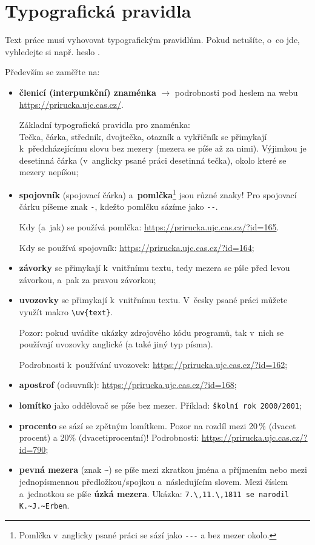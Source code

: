 \section{Typografická pravidla}\label{podkapTypo}
Text práce musí vyhovovat typografickým pravidlům. Pokud netušíte, o~co jde, vyhledejte si např. heslo .
\par 
Především se zaměřte na:
\begin{itemize}\itemsep=2pt
\item {\bf členicí (interpunkční) znaménka} $\rightarrow$ podrobnosti pod heslem  na webu \url{https://prirucka.ujc.cas.cz/}.\par
Základní typografická pravidla pro znaménka:\\
Tečka, čárka, středník, dvojtečka, otazník a vykřičník se přimykají k~předcházejícímu slovu bez mezery (mezera se píše až za nimi). Výjimkou je desetinná čárka (v~anglicky psané práci desetinná tečka), okolo které se mezery nepíšou;
\item {\bf spojovník} (spojovací čárka) a~{\bf pomlčka}\footnote{Pomlčka v~anglicky psané práci se sází jako \texttt{-{}-{}-} a bez mezer okolo.} jsou různé znaky! Pro spojovací čárku píšeme znak \texttt{-}, kdežto pomlčku sázíme jako \texttt{-{}-}.\par 
Kdy (a~jak) se používá pomlčka: \url{https://prirucka.ujc.cas.cz/?id=165}.\par 
Kdy se používá spojovník: \url{https://prirucka.ujc.cas.cz/?id=164};
\item {\bf závorky} se přimykají k~vnitřnímu textu, tedy mezera se píše  před levou závorkou, a~pak za pravou závorkou;
\item \textbf{uvozovky} se přimykají k~vnitřnímu textu. V~česky psané práci můžete využít makro {\tt \textbackslash uv\{text\}}. 
\par
Pozor: pokud uvádíte ukázky zdrojového kódu programů, tak v~nich se používají uvozovky anglické (a také jiný typ písma).
\par Podrobnosti k~používání uvozovek: \url{https://prirucka.ujc.cas.cz/?id=162};
\item \textbf{apostrof} (odsuvník): \url{https://prirucka.ujc.cas.cz/?id=168};
\item \textbf{lomítko} jako oddělovač se píše bez mezer. Příklad: {\tt školní rok 2000/2001}; %
\item \textbf{procento} se sází se zpětným lomítkem. Pozor na rozdíl mezi 20\,\% (dvacet procent) a 20\% (dvacetiprocentní)! Podrobnosti: \url{https://prirucka.ujc.cas.cz/?id=790};
\item \textbf{pevná mezera} (znak {\tt \textasciitilde}) se píše mezi zkratkou jména a příjmením nebo mezi jednopísmennou předložkou/spojkou a~následujícím slovem. Mezi číslem a~jednotkou se píše {\bf úzká mezera}. Ukázka: {\tt 7.\textbackslash,11.\textbackslash,1811 se narodil K.\textasciitilde J.\textasciitilde Erben}.
\end{itemize}

